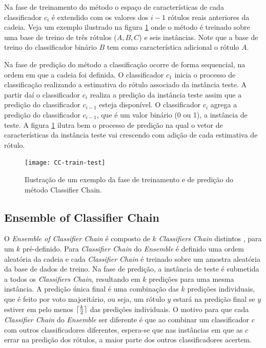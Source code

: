 Na fase de treinamento do método o espaço de características de cada classificador $c_i$ é 
extendido com os valores dos $i-1$ rótulos reais anteriores da cadeia. Veja um exemplo 
ilustrado na figura \ref{fig:CCtraintest} onde o método é treinado sobre uma base de treino de três rótulos ($A,B,C$)
e seis instâncias. Note que a base de treino do classificador binário $B$ tem como característica adicional o rótulo $A$.

Na fase de predição do método a classificação ocorre de forma sequencial, na ordem em que a cadeia foi definida.
O classificador $c_1$ inicia o processo de classificação realizando a estimativa do rótulo associado da instância teste.
A partir daí o classificador $c_i$ realiza a predição da instância teste assim que a predição do classificador $c_{i-1}$
esteja disponível. O classificador $c_i$ agrega a predição do classificador $c_{i-1}$, que é um valor binário (0 ou 1),
a instância de teste. A figura \ref{fig:CCtraintest} ilutra bem o processo de predição na qual o vetor de características da
instância teste vai crescendo com adição de cada estimativa de rótulo.


\begin{figure}

 \texttt{[image: CC-train-test]}
 \caption{Ilustração de um exemplo da fase de treinamento e de predição do método Classifier Chain.}
\label{fig:CCtraintest}
\end{figure}


\subsection{Ensemble of Classifier Chain}
O \textit{Ensemble of Classifier Chain} é composto de $k$ \textit{Classifiers Chain} distintos \cite{cc2009},
para um $k$ pré-definido.
Para \textit{Classifier Chain} do \textit{Ensemble} é definido uma ordem aleatória da cadeia e
cada \textit{Classifier Chain} é treinado sobre um amostra aleatória da base de dados de treino.
Na fase de predição, a instância de teste é submetida a todos os \textit{Classifiers Chain}, resultando
em $k$ predições para uma mesma instância. A predição única final é uma combinação das $k$ predições individuais,
que é feito por voto majoritário, ou seja, um rótulo $y$ estará na predição final se $y$ estiver
em pelo menos $\lceil\frac{k}{2}\rceil$ das predições individuais.
O motivo para que cada \textit{Classifier Chain} do \textit{Ensemble} ser diferente é que
ao combinar um classificador $c$ com outros classificadores diferentes,
espera-se que nas instâncias em que as $c$ errar na predição dos rótulos, a maior parte dos outros
classificadores acertem.




